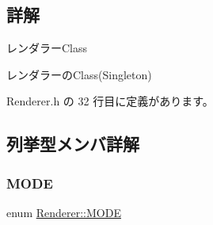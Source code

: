 \subsection{詳解}
レンダラー\+Class 

レンダラーの\+Class(\+Singleton) 

 Renderer.\+h の 32 行目に定義があります。



\subsection{列挙型メンバ詳解}
\mbox{\label{class_renderer_ab5a9379ccadcf2b3394c61cf8c835fec}} 
\subsubsection{\texorpdfstring{M\+O\+DE}{MODE}}
{\footnotesize\ttfamily enum \mbox{\hyperlink{class_renderer_ab5a9379ccadcf2b3394c61cf8c835fec}{Renderer\+::\+M\+O\+DE}}}


